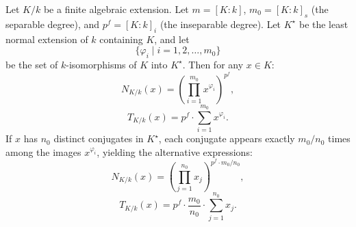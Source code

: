 Let $K/k$ be a finite algebraic extension. Let $m = [K:k]$, $m_0 = [K:k]_s$ (the separable degree), and $p^f = [K:k]_i$ (the inseparable degree). Let $K^\star$ be the least normal extension of $k$ containing $K$, and let
$$\{\varphi_i \mid i = 1, 2, \dots, m_0\}$$
be the set of $k$-isomorphisms of $K$ into $K^\star$. Then for any $x \in K$:
$$N_{K/k}(x) = \left( \prod_{i=1}^{m_0} x^{\varphi_i} \right)^{p^f},$$
$$T_{K/k}(x) = p^f \cdot \sum_{i=1}^{m_0} x^{\varphi_i}.$$
If $x$ has $n_0$ distinct conjugates in $K^\star$, each conjugate appears exactly $m_0/n_0$ times among the images $x^{\varphi_i}$, yielding the alternative expressions:
$$N_{K/k}(x) = \left( \prod_{j=1}^{n_0} x_j \right)^{p^f \cdot m_0/n_0},$$
$$T_{K/k}(x) = p^f \cdot \frac{m_0}{n_0} \cdot \sum_{j=1}^{n_0} x_j.$$
